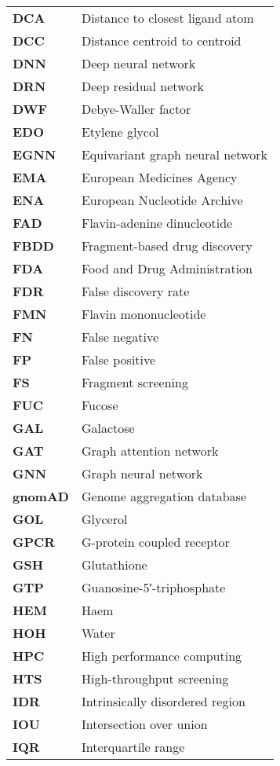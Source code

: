 \begin{longtable}[l]{@{}p{2.5cm}p{12cm}@{}}
\textbf{DCA} & Distance to closest ligand atom \\
\textbf{DCC} & Distance centroid to centroid \\
\textbf{DNN} & Deep neural network \\
\textbf{DRN} & Deep residual network \\
\textbf{DWF} & Debye-Waller factor \\
\textbf{EDO} & Etylene glycol \\
\textbf{EGNN} & Equivariant graph neural network \\
\textbf{EMA} & European Medicines Agency \\
\textbf{ENA} & European Nucleotide Archive \\
\textbf{FAD} & Flavin-adenine dinucleotide \\
\textbf{FBDD} & Fragment-based drug discovery \\
\textbf{FDA} & Food and Drug Administration \\
\textbf{FDR} & False discovery rate \\
\textbf{FMN} & Flavin mononucleotide \\
\textbf{FN} & False negative \\
\textbf{FP} & False positive \\
\textbf{FS} & Fragment screening \\
\textbf{FUC} & Fucose \\
\textbf{GAL} & Galactose \\
\textbf{GAT} & Graph attention network \\
\textbf{GNN} & Graph neural network \\
\textbf{gnomAD} & Genome aggregation database \\
\textbf{GOL} & Glycerol \\
\textbf{GPCR} & G-protein coupled receptor \\
\textbf{GSH} & Glutathione \\
\textbf{GTP} & Guanosine-5′-triphosphate \\
\textbf{HEM} & Haem \\
\textbf{HOH} & Water \\
\textbf{HPC} & High performance computing \\
\textbf{HTS} & High-throughput screening \\
\textbf{IDR} & Intrinsically disordered region \\
\textbf{IOU} & Intersection over union \\
\textbf{IQR} & Interquartile range \\

\end{longtable}
